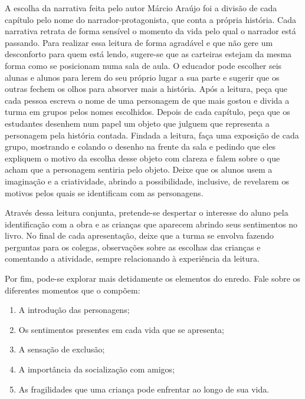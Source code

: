 \documentclass[11pt]{extarticle}
\begin{document}
A escolha da narrativa feita pelo autor Márcio Araújo foi a divisão de cada capítulo pelo nome do narrador-protagonista, que conta a própria história. Cada narrativa retrata de forma sensível o momento da vida pelo qual o narrador está passando. Para realizar essa leitura de forma agradável e que não gere um desconforto para quem está lendo, sugere-se que as carteiras estejam da mesma forma como se posicionam numa sala de aula. O educador pode escolher seis alunas e alunos para lerem do seu próprio lugar a sua parte e sugerir que os outras fechem os olhos para absorver mais a história. Após a leitura, peça que cada pessoa escreva o nome de uma personagem de que mais gostou e divida a turma em grupos pelos nomes escolhidos. Depois de cada capítulo, peça que os estudantes desenhem num papel um objeto que julguem que representa a personagem pela história contada. Findada a leitura, faça uma exposição de cada grupo, mostrando e colando o desenho na frente da sala e pedindo que eles expliquem o motivo da escolha desse objeto com clareza e falem sobre o que acham que a personagem sentiria pelo objeto. Deixe que os alunos usem a imaginação e a criatividade, abrindo a possibilidade, inclusive, de revelarem os motivos pelos quais se identificam com as personagens. 

Através dessa leitura conjunta, pretende-se despertar o interesse do aluno pela identificação com a obra e as crianças que aparecem abrindo seus sentimentos no livro. No final de cada apresentação, deixe que a turma se envolva fazendo perguntas para os colegas, observações sobre as escolhas das crianças e comentando a atividade, sempre relacionando à experiência da leitura. 


Por fim, pode-se explorar mais detidamente os elementos do enredo. Fale sobre os diferentes momentos que o compõem:

\begin{enumerate}

\item A introdução das personagens;
\item Os sentimentos presentes em cada vida que se apresenta;
\item A sensação de exclusão;
\item A importância da socialização com amigos;
\item As fragilidades que uma criança pode enfrentar ao longo de sua vida. 

\end{enumerate}
\end{document}
